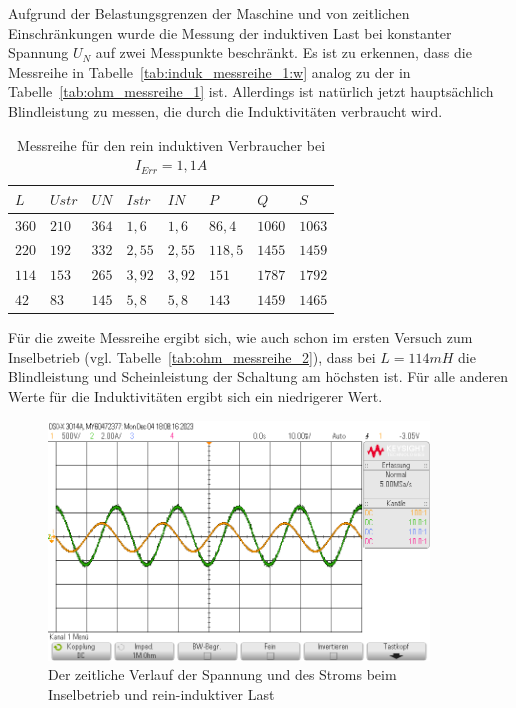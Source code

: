 \documentclass{report}
\begin{document}
Aufgrund der Belastungsgrenzen der Maschine und von zeitlichen Einschränkungen wurde die Messung der induktiven Last bei konstanter Spannung $U_{N}$ auf zwei Messpunkte beschränkt. Es ist zu erkennen, dass die Messreihe in Tabelle~\ref{tab:induk_messreihe_1:w} analog zu der in Tabelle~\ref{tab:ohm_messreihe_1} ist. Allerdings ist natürlich jetzt hauptsächlich Blindleistung zu messen, die durch die Induktivitäten verbraucht wird.


\begin{table}[!ht]
	\centering
	\begin{tabular}{llllllll}
		\hline
		$L$   & $Ustr$ & $UN$  & $Istr$ & $IN$   & $P$     & $Q$    & $S$    \\ \hline
		$360$ & $210$  & $364$ & $1,6$  & $1,6$  & $86,4$  & $1060$ & $1063$ \\
		$220$ & $192$  & $332$ & $2,55$ & $2,55$ & $118,5$ & $1455$ & $1459$ \\
		$114$ & $153$  & $265$ & $3,92$ & $3,92$ & $151$   & $1787$ & $1792$ \\
		$42$  & $83$   & $145$ & $5,8$  & $5,8$  & $143$   & $1459$ & $1465$ \\ \hline
	\end{tabular}
	\caption{Messreihe für den rein induktiven Verbraucher bei $I_{Err} = 1,1A$}
	\label{tab:induk_messreihe_2}
\end{table}

Für die zweite Messreihe ergibt sich, wie auch schon im ersten Versuch zum Inselbetrieb (vgl. Tabelle~\ref{tab:ohm_messreihe_2}), dass bei $L=114mH$ die Blindleistung und Scheinleistung der Schaltung am höchsten ist. Für alle anderen Werte für die Induktivitäten ergibt sich ein niedrigerer Wert.

\begin{figure}[!ht]
	\centering
	\includegraphics[width=0.9\textwidth]{./assets/img/Inselbetrieb360mHIE1.1.png}
	\caption{Der zeitliche Verlauf der Spannung und des Stroms beim Inselbetrieb und rein-induktiver Last}
	\label{fig:insel_reininduk_oszi}
\end{figure}
\end{document}
